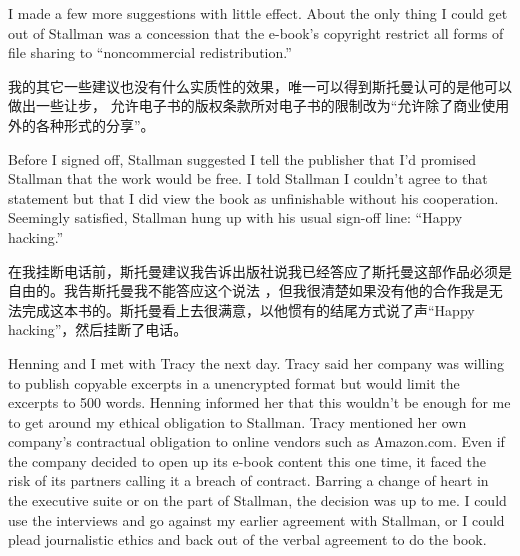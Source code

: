 
\ifdefined\eng
I made a few more suggestions with little effect. About the only thing I could get out of Stallman was a concession %
that the e-book's copyright restrict all forms of file sharing to ``noncommercial redistribution.''
\fi

\ifdefined\chs
我的其它一些建议也没有什么实质性的效果，唯一可以得到斯托曼认可的是他可以做出一些让步，%
允许电子书的版权条款所对电子书的限制改为``允许除了商业使用外的各种形式的分享''。
\fi

\ifdefined\eng
Before I signed off, Stallman suggested I tell the publisher that I'd promised Stallman that the work would be free. I told Stallman I couldn't agree to that statement %
but that I did view the book as unfinishable without his cooperation. Seemingly satisfied, Stallman hung up with his usual sign-off line: ``Happy hacking.''
\fi

\ifdefined\chs
在我挂断电话前，斯托曼建议我告诉出版社说我已经答应了斯托曼这部作品必须是自由的。我告斯托曼我不能答应这个说法%
，但我很清楚如果没有他的合作我是无法完成这本书的。斯托曼看上去很满意，以他惯有的结尾方式说了声``Happy hacking''，然后挂断了电话。
\fi

\ifdefined\eng
Henning and I met with Tracy the next day. Tracy said her company was willing to publish copyable excerpts in a unencrypted format but would limit the excerpts to 500 words. Henning informed her that this wouldn't be enough for me to get around my ethical obligation to Stallman. Tracy mentioned her own company's contractual obligation to online vendors such as Amazon.com. Even if the company decided to open up its e-book content this one time, it faced the risk of its partners calling it a breach of contract. Barring a change of heart in the executive suite or on the part of Stallman, the decision was up to me. I could use the interviews and go against my earlier agreement with Stallman, or I could plead journalistic ethics and back out of the verbal agreement to do the book.
\fi

